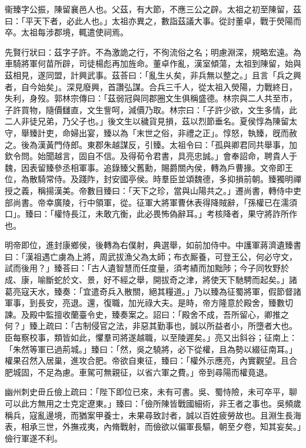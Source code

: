 
\begin{pinyinscope}
衞臻字公振，陳留襄邑人也。父茲，有大節，不應三公之辟。太祖之初至陳留，茲曰：「平天下者，必此人也。」太祖亦異之，數詣茲議大事。從討董卓，戰于熒陽而卒。太祖每涉郡境，輒遣使祠焉。

先賢行狀曰：茲字子許。不為激詭之行，不徇流俗之名；明慮淵深，規略宏遠。為車騎將軍何苗所辟，司徒楊彪再加旌命。董卓作亂，漢室傾蕩，太祖到陳留，始與茲相見，遂同盟，計興武事。茲荅曰：「亂生乆矣，非兵無以整之。」且言「兵之興者，自今始矣」。深見廢興，首讚弘謀。合兵三千人，從太祖入熒陽，力戰終日，失利，身歿。郭林宗傳曰：「茲弱冠與同郡圈文生俱稱盛德。林宗與二人共至市，子許買物，隨價讎直，文生訾呵，減價乃取。林宗曰：「子許少欲，文生多情，此二人非徒兄弟，乃父子也。」後文生以穢貨見損，茲以烈節垂名。夏侯惇為陳留太守，舉臻計吏，命婦出宴，臻以為「末世之俗，非禮之正」。惇怒，執臻，旣而赦之。後為漢黃門侍郎。東郡朱越謀反，引臻。太祖令曰：「孤與卿君同共舉事，加欽令問。始聞越言，固自不信。及得荀令君書，具亮忠誠。」會奉詔命，聘貴人于魏，因表留臻參丞相軍事。追錄臻父舊勳，賜爵關內侯，轉為戶曹掾。文帝即王位，為散騎常侍。及踐阼，封安國亭侯。時羣臣並頌魏德，多抑損前朝。臻獨明禪授之義，稱揚漢美。帝數目臻曰：「天下之珍，當與山陽共之。」遷尚書，轉侍中吏部尚書。帝幸廣陵，行中領軍，從。征軍大將軍曹休表得降賊辭，「孫權已在濡須口」。臻曰：「權恃長江，未敢亢衡，此必畏怖偽辭耳。」考核降者，果守將詐所作也。

明帝即位，進封康鄉侯，後轉為右僕射，典選舉，如前加侍中。中護軍蔣濟遺臻書曰：「漢祖遇亡虜為上將，周武拔漁父為太師；布衣厮養，可登王公，何必守文，試而後用？」臻荅曰：「古人遺智慧而任度量，須考績而加黜陟；今子同牧野於成、康，喻斷蛇於文、景，好不經之舉，開拔奇之津，將使天下馳騁而起矣。」諸葛亮寇天水，臻奏：「宜遣奇兵入散關，絕其糧道。」乃以臻為征蜀將軍，假節督諸軍事，到長安，亮退。還，復職，加光祿大夫。是時，帝方隆意於殿舍，臻數切諫。及殿中監擅收蘭臺令史，臻奏案之。詔曰：「殿舍不成，吾所留心，卿推之何？」臻上疏曰：「古制侵官之法，非惡其勤事也，誠以所益者小，所墮者大也。臣每察校事，類皆如此，懼羣司將遂越職，以至陵遲矣。」亮又出斜谷；征南上：「朱然等軍已過荊城。」臻曰：「然，吳之驍將，必下從權，且為勢以綴征南耳。」權果召然入居巢，進攻合肥。帝欲自東征，臻曰：「權外示應亮，內實觀望。且合肥城固，不足為慮。車駕可無親征，以省六軍之費。」帝到尋陽而權竟退。

幽州刺史毌丘儉上疏曰：「陛下即位已來，未有可書。吳、蜀恃險，未可卒平，聊可以此方無用之士克定遼東。」臻曰：「儉所陳皆戰國細術，非王者之事也。吳頻歲稱兵，寇亂邊境，而猶案甲養士，未果尋致討者，誠以百姓疲勞故也。且淵生長海表，相承三世，外撫戎夷，內脩戰射，而儉欲以偏軍長驅，朝至夕卷，知其妄矣。」儉行軍遂不利。


\end{pinyinscope}
